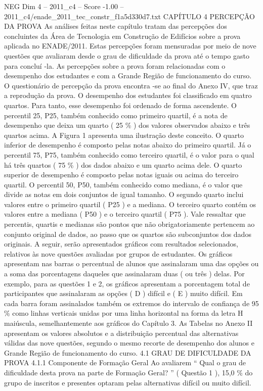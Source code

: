 \begin{textsample}{NEG Dim 4 – 2011\_c4 – Score -1.00 – 2011\_c4/enade\_2011\_tec\_constr\_f1a5d330d7.txt}  \label{ex:f4_neg_124}
CAPÍTULO 4 PERCEPÇÃO DA PROVA As análises feitas neste capítulo tratam das percepções dos concluintes da Área de Tecnologia em Construção de Edifícios sobre a prova aplicada no ENADE/2011.
Estas percepções foram mensuradas por meio de nove questões que avaliaram desde o grau de dificuldade da prova até o tempo gasto para concluí -la.
As percepções sobre a prova foram relacionadas com o desempenho dos estudantes e com a Grande Região de funcionamento do curso.
O questionário de percepção da prova encontra -se ao final do Anexo IV, que traz a reprodução da prova.
O desempenho dos estudantes foi classificado em quatro quartos.
Para tanto, esse desempenho foi ordenado de forma ascendente.
O percentil 25, P25, também conhecido como primeiro quartil, é a nota de desempenho que deixa um quarto ( 25 \% ) dos valores observados abaixo e três quartos acima.
A Figura 1 apresenta uma ilustração deste conceito.
O quarto inferior de desempenho é composto pelas notas abaixo do primeiro quartil.
Já o percentil 75, P75, também conhecido como terceiro quartil, é o valor para o qual há três quartos ( 75 \% ) dos dados abaixo e um quarto acima dele.
O quarto superior de desempenho é composto pelas notas iguais ou acima do terceiro quartil.
O percentil 50, P50, também conhecido como mediana, é o valor que divide as notas em dois conjuntos de igual tamanho.
O segundo quarto inclui valores entre o primeiro quartil ( P25 ) e a mediana.
O terceiro quarto contém os valores entre a mediana ( P50 ) e o terceiro quartil ( P75 ).
Vale ressaltar que percentis, quartis e medianas são pontos que não obrigatoriamente pertencem ao conjunto original de dados, ao passo que os quartos são subconjuntos dos dados originais.
A seguir, serão apresentados gráficos com resultados selecionados, relativos às nove questões avaliadas por grupos de estudantes.
Os gráficos apresentam nas barras o percentual de alunos que assinalaram uma das opções ou a soma das porcentagens daqueles que assinalaram duas ( ou três ) delas.
Por exemplo, para as questões 1 e 2, os gráficos apresentam a porcentagem total de participantes que assinalaram as opções ( D ) difícil e ( E ) muito difícil.
Em cada barra foram assinalados também os extremos do intervalo de confiança de 95 \% como linhas verticais unidas por uma linha horizontal na forma da letra H maiúscula, semelhantemente aos gráficos do Capítulo 3.
As Tabelas no Anexo II apresentam os valores absolutos e a distribuição percentual das alternativas válidas das nove questões, segundo o mesmo recorte de desempenho dos alunos e Grande Região de funcionamento do curso. 4.1 GRAU DE DIFICULDADE DA PROVA 4.1.1 Componente de Formação Geral Ao avaliarem “ Qual o grau de dificuldade desta prova na parte de Formação Geral? ” ( Questão 1 ), 15,0 \% do grupo de inscritos e presentes optaram pelas alternativas difícil ou muito difícil.

\end{textsample}

